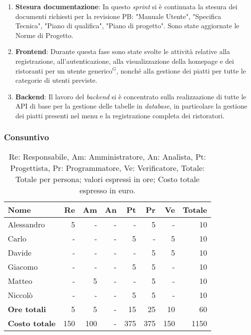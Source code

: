 \begin{enumerate}
	\item \textbf{Stesura documentazione}: In questo \textit{sprint} si è continuata la stesura dei documenti richiesti per la revisione PB: "Manuale Utente", "Specifica Tecnica", "Piano di qualifica", "Piano di progetto". Sono state aggiornate le Norme di Progetto.

	\item \textbf{Frontend}: Durante questa fase sono state svolte le attività relative alla registrazione, all'autenticazione, alla visualizzazione della homepage e dei ristoranti per un utente generico$^G$, nonché alla gestione dei piatti per tutte le categorie di utenti previste.

	\item \textbf{Backend}: Il lavoro del \textit{backend} si è concentrato sulla realizzazione di tutte le API di base per la gestione delle tabelle in \textit{database}, in particolare la gestione dei piatti presenti nel menu e la registrazione completa dei ristoratori.
\end{enumerate}

\subsubsection{Consuntivo}
\begin{table}[H]
	\centering
	\begin{tabular}{l|r|r|r|r|r|r|r}
		\textbf{Nome}         & \textbf{Re} & \textbf{Am} & \textbf{An} & \textbf{Pt} & \textbf{Pr} & \textbf{Ve} & \textbf{Totale} \\
		\hline
		Alessandro            & 5           & -           & -           & -           & 5           & -           & 10              \\
		Carlo                 & -           & -           & -           & 5           & -           & 5           & 10              \\
		Davide                & -           & -           & -           & -           & 5           & 5           & 10              \\
		Giacomo               & -           & -           & -           & 5           & 5          	& -           & 10              \\
		Matteo                & -           & 5           & -           & -           & 5           & -           & 10              \\
		Niccolò               & -           & -           & -           & 5           & 5           & -           & 10              \\
		\hline
		\textbf{Ore totali}   & 5           & 5           & -           & 15          & 25          & 10          & 60              \\
		\textbf{Costo totale} & 150         & 100         & -           & 375         & 375         & 150         & 1150
	\end{tabular}
	\caption{Re: Responsabile, Am: Amministratore, An: Analista, Pt: Progettista,
		Pr: Programmatore, Ve: Verificatore, Totale: Totale per persona; valori espressi in ore; Costo totale espresso in euro.}
\end{table}


